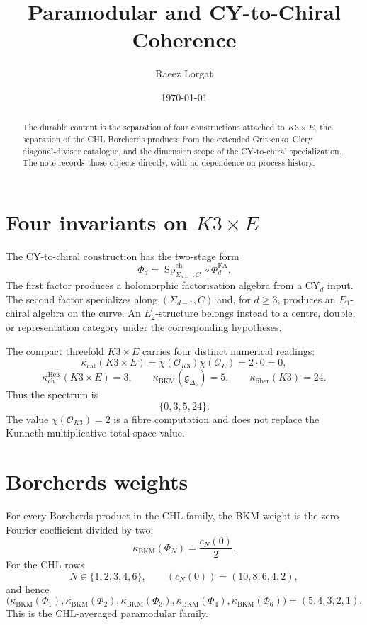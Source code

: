 \documentclass[11pt]{article}
\title{Paramodular and CY-to-Chiral Coherence}
\author{Raeez Lorgat}
\date{\today}
\providecommand{\cO}{\mathcal{O}}
\providecommand{\Phifa}{\Phi^{\mathrm{FA}}}
\providecommand{\kch}{\kappa_{\mathrm{ch}}}
\providecommand{\kcat}{\kappa_{\mathrm{cat}}}
\providecommand{\kBKM}{\kappa_{\mathrm{BKM}}}
\providecommand{\kfib}{\kappa_{\mathrm{fiber}}}
\begin{document}
\maketitle

\begin{abstract}
\noindent
The durable content is the separation of four constructions attached
to $K3 \times E$, the separation of the CHL Borcherds products from the
extended Gritsenko--Clery diagonal-divisor catalogue, and the dimension
scope of the CY-to-chiral specialization.  The note records those
objects directly, with no dependence on process history.
\end{abstract}

\section{Four invariants on $K3 \times E$}

The CY-to-chiral construction has the two-stage form
\[
  \Phi_d =
  \operatorname{Sp}^{\mathrm{ch}}_{\Sigma_{d-1}, C}
  \circ \Phifa_d .
\]
The first factor produces a holomorphic factorisation algebra from a
CY$_d$ input.  The second factor specializes along
$(\Sigma_{d-1}, C)$ and, for $d \geq 3$, produces an $E_1$-chiral
algebra on the curve.  An $E_2$-structure belongs instead to a centre,
double, or representation category under the corresponding hypotheses.

The compact threefold $K3 \times E$ carries four distinct numerical
readings:
\[
  \kcat(K3 \times E)
    = \chi(\cO_{K3})\chi(\cO_E)
    = 2 \cdot 0
    = 0,
\]
\[
  \kch^{\mathrm{Heis}}(K3 \times E)=3,\qquad
  \kBKM(\mathfrak g_{\Delta_5})=5,\qquad
  \kfib(K3)=24 .
\]
Thus the spectrum is
\[
  \{0,3,5,24\}.
\]
The value $\chi(\cO_{K3})=2$ is a fibre computation and does not replace
the Kunneth-multiplicative total-space value.

\section{Borcherds weights}

For every Borcherds product in the CHL family, the BKM weight is the
zero Fourier coefficient divided by two:
\[
  \kBKM(\Phi_N)=\frac{c_N(0)}{2}.
\]
For the CHL rows
\[
  N \in \{1,2,3,4,6\},
  \qquad
  (c_N(0))=(10,8,6,4,2),
\]
and hence
\[
  \bigl(\kBKM(\Phi_1),\kBKM(\Phi_2),\kBKM(\Phi_3),
  \kBKM(\Phi_4),\kBKM(\Phi_6)\bigr)
  =(5,4,3,2,1).
\]
This is the CHL-averaged paramodular family.
\end{document}

